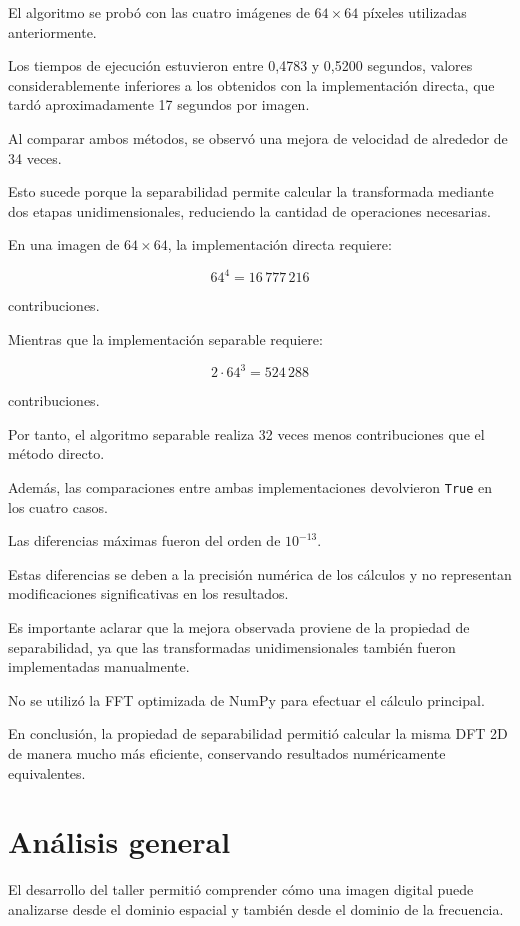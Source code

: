 \documentclass[11pt,letterpaper]{article}
\begin{document}
El algoritmo se probó con las cuatro imágenes
de $64\times64$ píxeles utilizadas anteriormente.

Los tiempos de ejecución estuvieron entre
0,4783 y 0,5200 segundos, valores considerablemente
inferiores a los obtenidos con la implementación
directa, que tardó aproximadamente 17 segundos
por imagen.

Al comparar ambos métodos, se observó una mejora
de velocidad de alrededor de 34 veces.

Esto sucede porque la separabilidad permite
calcular la transformada mediante dos etapas
unidimensionales, reduciendo la cantidad
de operaciones necesarias.

En una imagen de $64\times64$,
la implementación directa requiere:

\[
64^4=16\,777\,216
\]

contribuciones.

Mientras que la implementación separable
requiere:

\[
2\cdot64^3=524\,288
\]

contribuciones.

Por tanto, el algoritmo separable realiza
32 veces menos contribuciones
que el método directo.

Además, las comparaciones entre ambas
implementaciones devolvieron \texttt{True}
en los cuatro casos.

Las diferencias máximas fueron del orden
de $10^{-13}$.

Estas diferencias se deben a la precisión
numérica de los cálculos y no representan
modificaciones significativas en los resultados.

Es importante aclarar que la mejora observada
proviene de la propiedad de separabilidad,
ya que las transformadas unidimensionales
también fueron implementadas manualmente.

No se utilizó la FFT optimizada de NumPy
para efectuar el cálculo principal.

En conclusión, la propiedad de separabilidad
permitió calcular la misma DFT 2D de manera
mucho más eficiente, conservando resultados
numéricamente equivalentes.

\section{Análisis general}

El desarrollo del taller permitió comprender
cómo una imagen digital puede analizarse
desde el dominio espacial y también
desde el dominio de la frecuencia.
\end{document}
